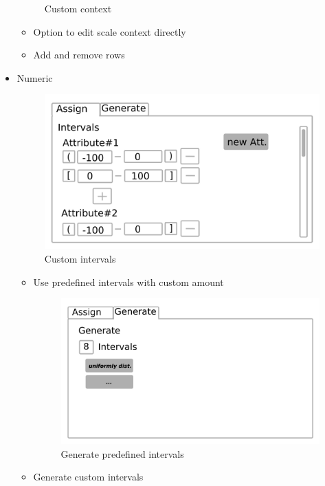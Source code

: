 \documentclass[]{article}
\begin{document}
\begin{itemize}
\begin{figure}[H]
			\caption{Custom context}
			\label{fig:o2}
		\end{figure}
		\begin{itemize}
			\item Option to edit scale context directly
			\item Add and remove rows
		\end{itemize}
	\item Numeric
		\begin{figure}[H]
			\includegraphics[width=\linewidth]{num.png}
			\caption{Custom intervals}
			\label{fig:n1}
		\end{figure}
	    \begin{itemize}
	    	\item Use predefined intervals with custom amount
	    	\begin{figure}[H]
	    		\includegraphics[width=\linewidth]{num_gen.png}
	    		\caption{Generate predefined intervals}
	    		\label{fig:n1}
	    	\end{figure}
	    	\item Generate custom intervals
	    \end{itemize}
\end{itemize}
\end{document}
